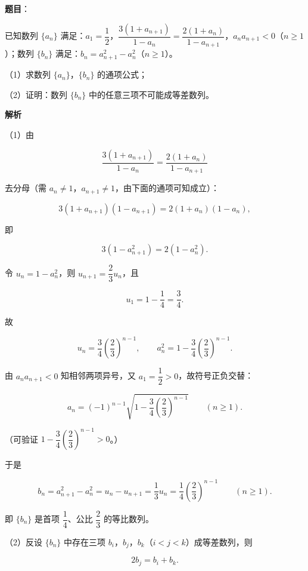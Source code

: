 \begin{answer}

\textbf{题目}：

已知数列 $\{a_n\}$ 满足：$a_1=\dfrac12$，$\dfrac{3(1+a_{n+1})}{1-a_n}=\dfrac{2(1+a_n)}{1-a_{n+1}}$，$a_na_{n+1}<0$（$n\geqslant1$）；数列 $\{b_n\}$ 满足：$b_n=a_{n+1}^2-a_n^2$（$n\geqslant1$）。

（1）求数列 $\{a_n\}$，$\{b_n\}$ 的通项公式；

（2）证明：数列 $\{b_n\}$ 中的任意三项不可能成等差数列。

\textbf{解析}

（1）由

\nopagebreak[4]
\[\frac{3(1+a_{n+1})}{1-a_n}=\frac{2(1+a_n)}{1-a_{n+1}}\]

去分母（需 $a_n\neq1$，$a_{n+1}\neq1$，由下面的通项可知成立）：

\nopagebreak[4]
\[3(1+a_{n+1})(1-a_{n+1})=2(1+a_n)(1-a_n),\]

即

\nopagebreak[4]
\[3\left(1-a_{n+1}^2\right)=2\left(1-a_n^2\right).\]

令 $u_n=1-a_n^2$，则 $u_{n+1}=\dfrac23u_n$，且

\nopagebreak[4]
\[u_1=1-\frac14=\frac34.\]

故

\nopagebreak[4]
\[u_n=\frac34\left(\frac23\right)^{n-1},\qquad
a_n^2=1-\frac34\left(\frac23\right)^{n-1}.\]

由 $a_na_{n+1}<0$ 知相邻两项异号，又 $a_1=\dfrac12>0$，故符号正负交替：

\nopagebreak[4]
\[a_n=(-1)^{n-1}\sqrt{1-\frac34\left(\frac23\right)^{n-1}}\qquad(n\geqslant1).\]

（可验证 $1-\dfrac34\left(\dfrac23\right)^{n-1}>0$。）

于是

\nopagebreak[4]
\[b_n=a_{n+1}^2-a_n^2=u_n-u_{n+1}
=\frac13u_n=\frac14\left(\frac23\right)^{n-1}\qquad(n\geqslant1).\]

即 $\{b_n\}$ 是首项 $\dfrac14$、公比 $\dfrac23$ 的等比数列。

（2）反设 $\{b_n\}$ 中存在三项 $b_i$，$b_j$，$b_k$（$i<j<k$）成等差数列，则

\nopagebreak[4]
\[2b_j=b_i+b_k.\]


\end{answer}

